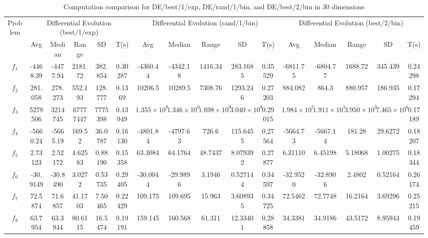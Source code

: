 \documentclass[paper=a4, fontsize=11pt]{scrartcl} %
\numberwithin{equation}{section} %
\numberwithin{figure}{section} %
\numberwithin{table}{section} %
\begin{document}
\begin{landscape}
	\begin{table}
		\tiny
		\centering
		\caption{Computation comparison for DE/best/1/exp, DE/rand/1/bin, and DE/best/2/bin in 30 dimensions}
		\label{Tab1d}
		\begin{tabular}{c|ccccc|ccccc|ccccc}
			\noalign{\smallskip}\hline\noalign{\smallskip}
			Problem & \multicolumn{5}{c}{Differential Evolution (best/1/exp)}& \multicolumn{5}{|c|}{Differential Evolution (rand/1/bin)} &  \multicolumn{5}{c}{Differential Evolution (best/2/bin)} \\ 
			\noalign{\smallskip}\hline\noalign{\smallskip}
			& Avg & Median & Range & SD & T(s) & Avg & Median
			& Range & SD & T(s) & Avg & Median & Range & SD &
			T(s) \\ 
			\noalign{\smallskip}\hline\noalign{\smallskip}
			$f_{1}$  & -4468.39 & -4477.94 & 2181.72 & 382.854 & 0.30287 & -4360.44 & -4342.18 & 1416.34 & 283.1685 & 0.35529 & -6811.75 & -6804.77 & 1688.72 & 345.439 & 0.24298\\
			$f_{2}$  &  281.058 &  278.273 & 552.193 & 128.777 & 0.1369  &  10206.5 &  10289.5 & 7308.76 & 1293.246 & 0.27203 &  884.082 &  864.3   & 880.957 & 186.935 & 0.17294\\
			$f_{3}$  &  5278506 & 3214745 & 67777447 & 7775398 & 0.13949 &  $1.355\times 10^{9}$ & $1.346\times 10^{9}$ & $1.698\times 10^{9}$ & $3.040\times 10^{8}$ & 0.29015 & $1.984\times 10^{7}$ & $1.911\times 10^{7}$ & $3.950\times 10^{7}$ & $7.465\times 10^{6}$ & 0.17189\\
			$f_{4}$  & -5660.24 & -5665.19 & 169.52  & 36.0787 & 0.16130 & -4801.84 & -4797.63 & 726.6   & 115.6455 & 0.27564 & -5664.73 & -5667.14 & 181.28  & 29.6272 & 0.18207\\
			$f_{5}$  &  2.73123 &  2.52172 & 4.62583 & 0.88190 & 0.15358 &  63.3084 &  64.1764 & 48.7437 & 8.079392 & 0.27877 &  6.31110 &  6.45198 & 5.18068 & 1.00275 & 0.18344\\
			$f_{6}$  & -30.9149 & -30.8490 & 3.0272  & 0.53735 & 0.29405 & -30.0044 & -29.9896 & 3.1946  & 0.527144 & 0.34597 & -32.9520 & -32.8906 & 2.4802  & 0.52164 & 0.26174\\
			$f_{7}$  &  72.5874 &  71.6857 & 41.1703 & 7.50465 & 0.22429 &  109.175 &  109.695 & 15.963  & 3.608935 & 0.34725 &  72.5462 &  72.7748 & 16.2164 & 3.69296 & 0.25215\\
			$f_{8}$  &  63.7954 &  63.3944 & 80.6115 & 16.5474 & 0.19191 &  159.145 &  160.568 & 61.311  & 12.33401 & 0.28858 &  34.3381 &  34.9186 & 43.5172 & 8.95944 & 0.19459\\

\end{tabular}
\end{table}
\end{landscape}
\end{document}
